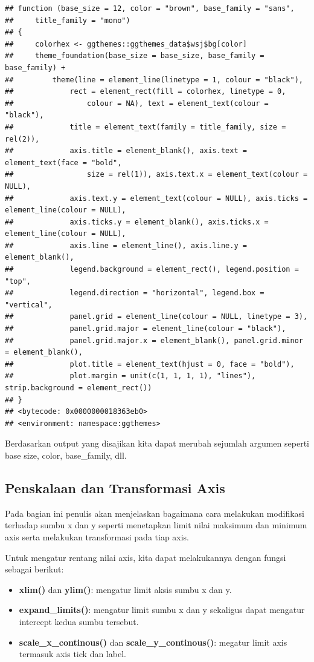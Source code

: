 \documentclass[]{book}
\providecommand{\tightlist}{%
  \setlength{\itemsep}{0pt}\setlength{\parskip}{0pt}}
\begin{document}
\begin{verbatim}
## function (base_size = 12, color = "brown", base_family = "sans", 
##     title_family = "mono") 
## {
##     colorhex <- ggthemes::ggthemes_data$wsj$bg[color]
##     theme_foundation(base_size = base_size, base_family = base_family) + 
##         theme(line = element_line(linetype = 1, colour = "black"), 
##             rect = element_rect(fill = colorhex, linetype = 0, 
##                 colour = NA), text = element_text(colour = "black"), 
##             title = element_text(family = title_family, size = rel(2)), 
##             axis.title = element_blank(), axis.text = element_text(face = "bold", 
##                 size = rel(1)), axis.text.x = element_text(colour = NULL), 
##             axis.text.y = element_text(colour = NULL), axis.ticks = element_line(colour = NULL), 
##             axis.ticks.y = element_blank(), axis.ticks.x = element_line(colour = NULL), 
##             axis.line = element_line(), axis.line.y = element_blank(), 
##             legend.background = element_rect(), legend.position = "top", 
##             legend.direction = "horizontal", legend.box = "vertical", 
##             panel.grid = element_line(colour = NULL, linetype = 3), 
##             panel.grid.major = element_line(colour = "black"), 
##             panel.grid.major.x = element_blank(), panel.grid.minor = element_blank(), 
##             plot.title = element_text(hjust = 0, face = "bold"), 
##             plot.margin = unit(c(1, 1, 1, 1), "lines"), strip.background = element_rect())
## }
## <bytecode: 0x0000000018363eb0>
## <environment: namespace:ggthemes>
\end{verbatim}

Berdasarkan output yang disajikan kita dapat merubah sejumlah argumen
seperti base size, color, base\_family, dll.

\subsection{Penskalaan dan Transformasi
Axis}\label{penskalaan-dan-transformasi-axis}

Pada bagian ini penulis akan menjelaskan bagaimana cara melakukan
modifikasi terhadap sumbu x dan y seperti menetapkan limit nilai
maksimum dan minimum axis serta melakukan transformasi pada tiap axis.

Untuk mengatur rentang nilai axis, kita dapat melakukannya dengan fungsi
sebagai berikut:

\begin{itemize}
\tightlist
\item
  \textbf{xlim()} dan \textbf{ylim()}: mengatur limit aksis sumbu x dan
  y.
\item
  \textbf{expand\_limits()}: mengatur limit sumbu x dan y sekaligus
  dapat mengatur intercept kedua sumbu tersebut.
\item
  \textbf{scale\_x\_continous()} dan \textbf{scale\_y\_continous()}:
  megatur limit axis termasuk axis tick dan label.
\end{itemize}
\end{document}
